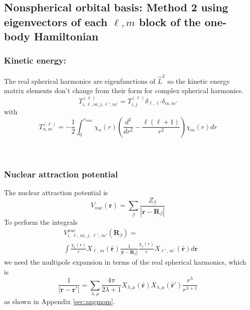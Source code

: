 \documentclass[%
pra%
,twocolumn%
,amssymb, nobibnotes, aps,
longbibliography
]{revtex4-1}
\begin{document}
\subsection{Nonspherical orbital basis: Method 2 using eigenvectors of each $\ell,m$ block of the one-body Hamiltonian}
\label{sec:lorbs}



\subsubsection{Kinetic energy:}  
The real spherical harmonics are eigenfunctions of $\hat{L}^2$ so the kinetic energy matrix
elements don't change from their form for complex spherical harmonics.
\begin{equation}
T_{i,\ell,m;j,\ell',m'}^{(\ell)} =  T_{i,j}^{(\ell)}  \delta_{\ell,\ell'} \delta_{m,m'}
\end{equation}
with
\begin{equation}
T_{n,m}^{(\ell)} = -\frac{1}{2} \int_0^{r_{max}} \chi_n(r)
\left(\frac{d^2}{dr^2}-\frac{\ell(\ell+1)}{r^2}\right)
\chi_m(r) dr
\end{equation}
\\
\

\subsubsection{Nuclear attraction potential}
The nuclear attraction potential is
\begin{equation}
V_{nuc}(\mathbf{r}) = \sum_\beta \frac{Z_\beta}{|\mathbf{r}-\mathbf{R}_\beta|}
\end{equation}
To perform the integrals 
\begin{equation}
\begin{split}
& V^{nuc}_{i, \, \ell, \,m; \, j, \,\ell', \, m'}(\mathbf{R}_\beta) = \\
&\int \frac{\chi_{i}(r)}{r}X_{\ell, \,m} (\mathbf{\hat{r}})
\frac{1}{|\mathbf{r}-\mathbf{R}_\beta|}
\frac{\chi_j(r)}{r} X_{\ell', \, m'} (\mathbf{\hat{r}})
d\mathbf{r}
\end{split}
\end{equation}
we need the multipole expansion in terms of the real spherical harmonics, which is
\begin{equation}
\frac{1}{| \mathbf{r}- \mathbf{r}'|} = 
 \sum_{\lambda,\mu} \frac{4 \pi}{2\lambda +1}
X_{\lambda,\mu}(\mathbf{\hat{r}})
X_{\lambda,\mu}(\mathbf{\hat{r}}')
\frac{r^\lambda}{r^{\lambda+1}}
\end{equation}
as shown in Appendix \ref{sec:angmom}.
\end{document}
